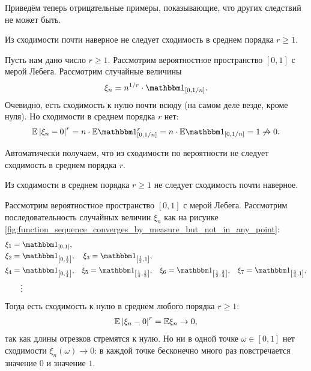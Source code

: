 \documentclass[../main.tex]{subfiles}
\begin{document}
Приведём теперь отрицательные примеры, показывающие, что других следствий не может быть.

\begin{exmpl}
 Из сходимости почти наверное не следует сходимость в среднем порядка $ r \geqslant 1 $.

 Пусть нам дано число $ r \geqslant 1 $. Рассмотрим вероятностное пространство $ [0,1] $ с мерой Лебега. Рассмотрим случайные величины
 \begin{align*}
  \xi_n = n^{1 / r} \cdot \Ind_{[0,1 / n]}.
 \end{align*} Очевидно, есть сходимость к нулю почти всюду (на самом деле везде, кроме нуля). Но сходимости в среднем порядка $ r $ нет:
 \begin{align*}
  \E \left| \xi_n - 0 \right|^{r} = n \cdot \E\Ind_{[0, 1 / n]}^{r} = n \cdot \E\Ind_{[0,1 / n]} = 1 \not\rightarrow 0.
 \end{align*}
\end{exmpl}

Автоматически получаем, что из сходимости по вероятности не следует сходимость в среднем порядка $ r $.

\begin{exmpl}
 Из сходимости в среднем порядка $ r \geqslant 1 $ не следует сходимость почти наверное.

 Рассмотрим вероятностное пространство $ [0,1] $ с мерой Лебега. Рассмотрим последовательность случайных величин $\xi_n$ как на рисунке \ref{fig:function_sequence_converges_by_measure_but_not_in_any_point}: \begin{align*}
  &\xi_1 = \Ind_{\left[0,1\right]},\\
  &\xi_2 = \Ind_{\left[0, \frac{1}{2}\right]}, &\xi_3 = \Ind_{\left[ \frac{1}{2}, 1 \right]},\\
  &\xi_4 = \Ind_{\left[ 0,\frac{1}{4} \right]}, &\xi_5 = \Ind_{\left[ \frac{1}{4},\frac{1}{2} \right]}, &&\xi_6 = \Ind_{\left[ \frac{1}{2},\frac{3}{4} \right]}, &&\xi_7=\Ind_{\left[ \frac{3}{4},1 \right]}, \\
  &\qquad\vdots
 \end{align*}
 Тогда есть сходимость к нулю в среднем любого порядка $ r \geqslant 1 $:
 \begin{align*}
  \mathbb E \left| \xi_n - 0 \right|^{r} = \mathbb E \xi_n \to 0,
 \end{align*} так как длины отрезков стремятся к нулю. Но ни в одной точке $ \omega \in [0,1] $ нет сходимости $ \xi_n(\omega) \to 0 $: в каждой точке бесконечно много раз повстречается значение $ 0 $ и значение $ 1 $.
\end{exmpl}
\end{document}
